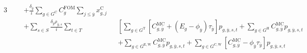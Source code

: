 \documentclass{article}
\newcommand{\sGeneratorsExisting}{G^{\mathrm{E}}}
\newcommand{\sGeneratorsExistingWind}{G^{\mathrm{E,W}}}
\newcommand{\sGeneratorsExistingSolar}{G^{\mathrm{E,S}}}
\newcommand{\sGeneratorsCandidate}{G^{\mathrm{C}}}
\newcommand{\sGeneratorsCandidateWind}{G^{\mathrm{C,W}}}
\newcommand{\sGeneratorsCandidateSolar}{G^{\mathrm{C,S}}}
\newcommand{\sGeneratorsThermal}{G^{\mathrm{T}}}
\newcommand{\sGeneratorsHydro}{G^{\mathrm{H}}}
\newcommand{\sStorage}{G^{\mathrm{Q}}}
\newcommand{\sScenarios}{S}
\newcommand{\sIntervals}{T}
\newcommand{\sZones}{Z}
\newcommand{\iGenerator}{g}
\newcommand{\iYear}{y}
\newcommand{\iYearTerminal}{\overline{\iYear}}
\newcommand{\iYearAlias}{j}
\newcommand{\iScenario}{s}
\newcommand{\iInterval}{t}
\newcommand{\iZone}{z}
\newcommand{\cFixedOperationsMaintenanceCostGenerator}[1][\iGenerator]{C^{\mathrm{FOM}}_{#1}}
\newcommand{\cScenarioDuration}[1][\iYear,\iScenario]{\rho_{#1}}
\newcommand{\cMarginalCost}[1][\iGenerator,\iYear]{C^{\mathrm{MC}}_{#1}}
\newcommand{\cEmissionsIntensity}[1][\iGenerator]{E_{#1}}
\newcommand{\cPowerOutputMax}[1][\iGenerator,\iYear]{\overline{P}_{#1}}
\newcommand{\cInterestRate}{i}
\newcommand{\cLostLoadCost}{C^{\mathrm{L}}}
\newcommand{\cRetirementIndicator}[1][\iGenerator,\iYear]{F_{#1}}
\newcommand{\cDiscountRate}[1][\iYear]{\delta_{#1}}
\newcommand{\vBaseline}[1][\iYear]{\phi_{#1}}
\newcommand{\vPermitPrice}[1][\iYear]{\tau_{#1}}
\newcommand{\vEnergy}[1][\iGenerator,\iYear,\iScenario,\iInterval]{e_{#1}}
\newcommand{\vInstalledCapacity}[1][\iGenerator,\iYear]{x^{\mathrm{C}}_{#1}}
\newcommand{\vPower}[1][\iGenerator,\iYear,\iScenario,\iInterval]{p_{#1}}
\newcommand{\vLostLoadPower}[1][\iZone,\iYear,\iScenario,\iInterval]{p^{\mathrm{V}}_{#1}}
\begin{document}
\begin{alignat}{3}
	& && + \frac{\cDiscountRate[\iYearTerminal]}{\cInterestRate}\sum\limits_{\iGenerator \in \sGeneratorsCandidate} \cFixedOperationsMaintenanceCostGenerator \sum\limits_{\iYearAlias \leq \iYearTerminal} \vInstalledCapacity[\iGenerator,\iYearAlias]\\
	& && + \sum\limits_{\iScenario \in \sScenarios} \frac{\cDiscountRate[\iYearTerminal]\cScenarioDuration[\iYearTerminal,\iScenario]}{\cInterestRate} \sum\limits_{\iInterval \in \sIntervals} && \left[\sum\limits_{\iGenerator \in \sGeneratorsThermal} \left[\cMarginalCost[\iGenerator,\iYearTerminal] + (\cEmissionsIntensity - \vBaseline[\iYearTerminal])\vPermitPrice[\iYearTerminal]\right]\vPower[\iGenerator,\iYearTerminal,\iScenario,\iInterval]  + \sum\limits_{\iGenerator \in \sGeneratorsHydro}\cMarginalCost[\iGenerator,\iYearTerminal] \vPower[\iGenerator,\iYearTerminal,\iScenario,\iInterval] \right. \nonumber\\
	& && && + \sum\limits_{\iGenerator \in \sGeneratorsExistingWind} \cMarginalCost[\iGenerator,\iYearTerminal] \vPower[\iGenerator,\iYearTerminal,\iScenario,\iInterval] + \sum\limits_{\iGenerator \in \sGeneratorsCandidateWind} \left[\cMarginalCost[\iGenerator,\iYearTerminal] - \vBaseline[\iYearTerminal] \vPermitPrice[\iYearTerminal]\right] \vPower[\iGenerator,\iYearTerminal,\iScenario,\iInterval] \nonumber\\

\end{alignat}
\end{document}
